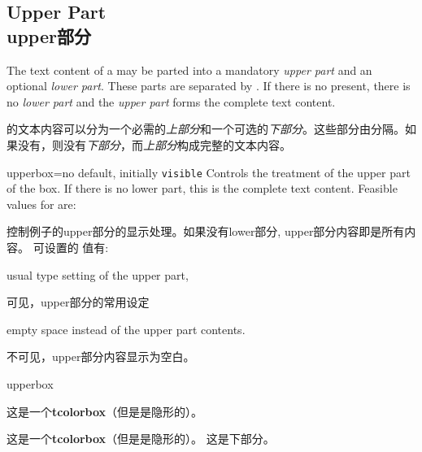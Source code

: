 \subsection{Upper Part\\upper部分}

The text content of a  may be parted into a mandatory \emph{upper part}
and an optional \emph{lower part}. These parts are separated by
. If there is no  present, there is no
\emph{lower part} and the \emph{upper part} forms the complete text content.


 的文本内容可以分为一个必需的\emph{上部分}和一个可选的\emph{下部分}。这些部分由分隔。如果没有，则没有\emph{下部分}，而\emph{上部分}构成完整的文本内容。

\begin{docTcbKey}[][doc new=2015-01-06]{upperbox}{=}{no default, initially \texttt{visible}}
Controls the treatment of the upper part of the box. If there is no lower part,  this is the complete text content.
Feasible values for  are:

控制例子的upper部分的显示处理。如果没有lower部分, upper部分内容即是所有内容。
可设置的  值有:
\begin{DescriptionL}{}
\item[\docValue{visible}]usual type setting of the upper part,
\par 可见，upper部分的常用设定
\item[\docValue{invisible}] empty space instead of the upper part contents.
\par 不可见，upper部分内容显示为空白。
\end{DescriptionL}
\begin{exdispExample}{upperbox}
\begin{tcolorbox}[upperbox=invisible,colback=white%
,title=upperbox设置为invisible且没有lower部分]
这是一个\textbf{tcolorbox}（但是是隐形的）。
\end{tcolorbox}

\begin{tcolorbox}[upperbox=invisible,colback=white%
,title=upperbox设置为invisible时只显示lower部分]
这是一个\textbf{tcolorbox}（但是是隐形的）。
\tcblower
这是下部分。
\end{tcolorbox}
\end{exdispExample}
\end{docTcbKey}


